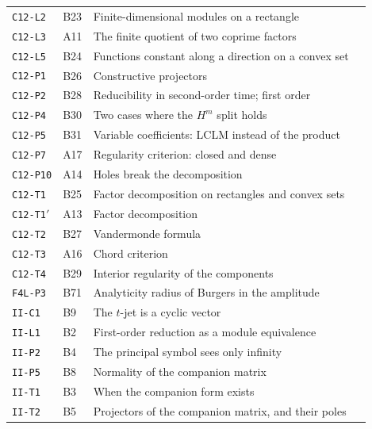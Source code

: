 \documentclass[11pt,a4paper,oneside]{report}
\begin{document}
\begin{center}
\begin{longtable}{@{}L{3.0cm}L{1.2cm}L{8.4cm}L{1.2cm}@{}}
\texttt{C12-L2} & B23 & Finite-dimensional modules on a rectangle & \pageref{dim:C12-L2}\\
\texttt{C12-L3} & A11 & The finite quotient of two coprime factors & \pageref{dim:C12-L3}\\
\texttt{C12-L5} & B24 & Functions constant along a direction on a convex set & \pageref{dim:C12-L5}\\
\texttt{C12-P1} & B26 & Constructive projectors & \pageref{dim:C12-P1}\\
\texttt{C12-P2} & B28 & Reducibility in second-order time; first order & \pageref{dim:C12-P2}\\
\texttt{C12-P4} & B30 & Two cases where the $H^m$ split holds & \pageref{dim:C12-P4}\\
\texttt{C12-P5} & B31 & Variable coefficients: LCLM instead of the product & \pageref{dim:C12-P5}\\
\texttt{C12-P7} & A17 & Regularity criterion: closed and dense & \pageref{dim:C12-P7}\\
\texttt{C12-P10} & A14 & Holes break the decomposition & \pageref{dim:C12-P10}\\
\texttt{C12-T1} & B25 & Factor decomposition on rectangles and convex sets & \pageref{dim:C12-T1}\\
\texttt{C12-T1$'$} & A13 & Factor decomposition & \pageref{dim:C12-T1'}\\
\texttt{C12-T2} & B27 & Vandermonde formula & \pageref{dim:C12-T2}\\
\texttt{C12-T3} & A16 & Chord criterion & \pageref{dim:C12-T3}\\
\texttt{C12-T4} & B29 & Interior regularity of the components & \pageref{dim:C12-T4}\\
\texttt{F4L-P3} & B71 & Analyticity radius of Burgers in the amplitude & \pageref{dim:F4L-P3}\\
\texttt{II-C1} & B9 & The $t$-jet is a cyclic vector & \pageref{dim:II-C1}\\
\texttt{II-L1} & B2 & First-order reduction as a module equivalence & \pageref{dim:II-L1}\\
\texttt{II-P2} & B4 & The principal symbol sees only infinity & \pageref{dim:II-P2}\\
\texttt{II-P5} & B8 & Normality of the companion matrix & \pageref{dim:II-P5}\\
\texttt{II-T1} & B3 & When the companion form exists & \pageref{dim:II-T1}\\
\texttt{II-T2} & B5 & Projectors of the companion matrix, and their poles & \pageref{dim:II-T2}\\

\end{longtable}
\end{center}
\end{document}

